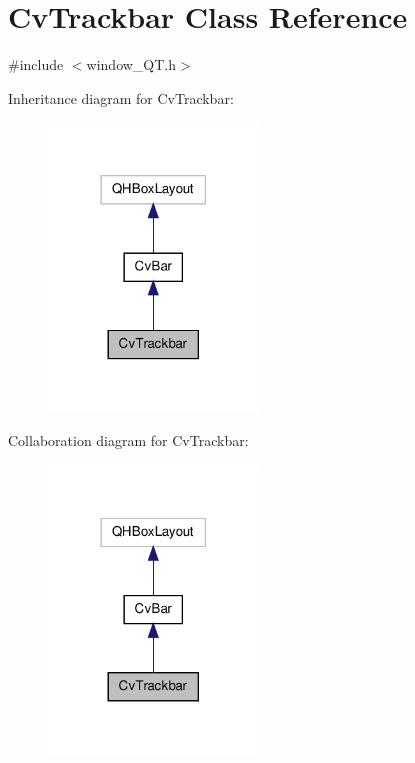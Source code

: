 \hypertarget{classCvTrackbar}{\section{Cv\-Trackbar Class Reference}
\label{classCvTrackbar}
}


{\ttfamily \#include $<$window\-\_\-\-Q\-T.\-h$>$}



Inheritance diagram for Cv\-Trackbar\-:\nopagebreak
\begin{figure}[H]
\begin{center}
\leavevmode
\includegraphics[width=158pt]{classCvTrackbar__inherit__graph}
\end{center}
\end{figure}


Collaboration diagram for Cv\-Trackbar\-:\nopagebreak
\begin{figure}[H]
\begin{center}
\leavevmode
\includegraphics[width=158pt]{classCvTrackbar__coll__graph}
\end{center}
\end{figure}
